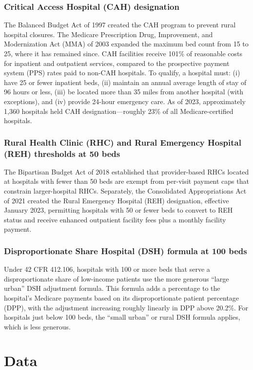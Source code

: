 \documentclass[12pt]{article}
\begin{document}
\subsubsection*{Critical Access Hospital (CAH) designation}  The Balanced Budget Act of 1997 created the CAH program to prevent rural hospital closures. The Medicare Prescription Drug, Improvement, and Modernization Act (MMA) of 2003 expanded the maximum bed count from 15 to 25, where it has remained since. CAH facilities receive 101\% of reasonable costs for inpatient and outpatient services, compared to the prospective payment system (PPS) rates paid to non-CAH hospitals. To qualify, a hospital must: (i) have 25 or fewer inpatient beds, (ii) maintain an annual average length of stay of 96 hours or less, (iii) be located more than 35 miles from another hospital (with exceptions), and (iv) provide 24-hour emergency care. As of 2023, approximately 1,360 hospitals held CAH designation---roughly 23\% of all Medicare-certified hospitals.

\subsubsection*{Rural Health Clinic (RHC) and Rural Emergency Hospital (REH) thresholds at 50 beds}  The Bipartisan Budget Act of 2018 established that provider-based RHCs located at hospitals with fewer than 50 beds are exempt from per-visit payment caps that constrain larger-hospital RHCs. Separately, the Consolidated Appropriations Act of 2021 created the Rural Emergency Hospital (REH) designation, effective January 2023, permitting hospitals with 50 or fewer beds to convert to REH status and receive enhanced outpatient facility fees plus a monthly facility payment.

\subsubsection*{Disproportionate Share Hospital (DSH) formula at 100 beds}  Under 42 CFR 412.106, hospitals with 100 or more beds that serve a disproportionate share of low-income patients use the more generous ``large urban'' DSH adjustment formula. This formula adds a percentage to the hospital's Medicare payments based on its disproportionate patient percentage (DPP), with the adjustment increasing roughly linearly in DPP above 20.2\%. For hospitals just below 100 beds, the ``small urban'' or rural DSH formula applies, which is less generous.

\section{Data}
\end{document}
